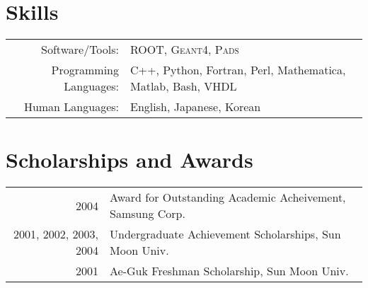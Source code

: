 \documentclass[a4paper,10pt]{article} %
\begin{document}

\section{Skills}

\begin{tabular}{rl}
	Software/Tools: & \textsc{ROOT}, \textsc{Geant4}, \textsc{Pads}\\
	Programming Languages: & C++, Python, Fortran, Perl, Mathematica, Matlab, Bash, VHDL\\
	Human Languages: & English, Japanese, Korean
\end{tabular}


\section{Scholarships and Awards}

\begin{tabular}{rl}
	2004 & Award for Outstanding Academic Acheivement, Samsung Corp.\\
	2001, 2002, 2003, 2004 & Undergraduate Achievement Scholarships, Sun Moon
	Univ.\\
	2001 & Ae-Guk Freshman Scholarship, Sun Moon Univ.\\
\end{tabular}


%
%

\end{document}
